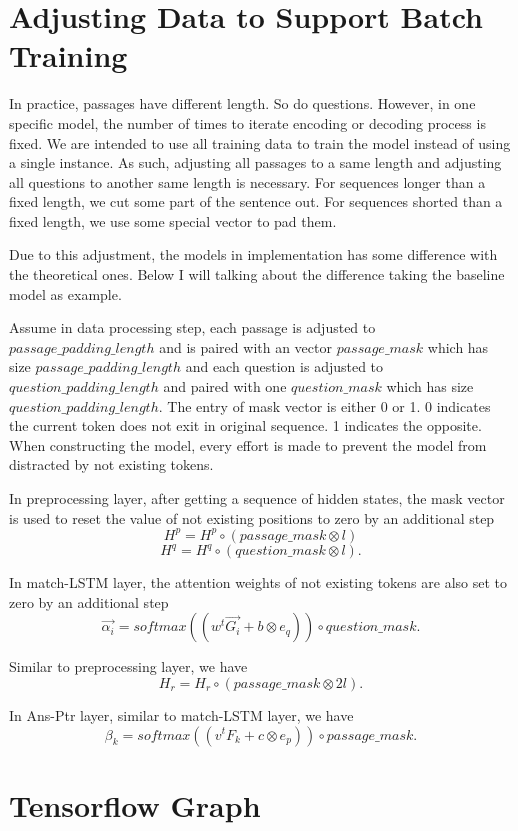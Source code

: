 \documentclass[modernstyle,12pt]{sjsuthesis}
\theoremstyle{definition}
\begin{document}
\section{Adjusting Data to Support Batch Training}\label{sect:padding}

In practice, passages have different length. So do questions. However, in one specific model, the number of times to iterate encoding or decoding process is fixed. We are intended to use all training data to train the model instead of using a single instance. As such, adjusting all passages to a same length and adjusting all questions to another same length is necessary. For sequences longer than a fixed length, we cut some part of the sentence out. For sequences shorted than a fixed length, we use some special vector to pad them.

Due to this adjustment, the models in implementation has some difference with the theoretical ones. Below I will talking about the difference taking the baseline model as example.

Assume in data processing step, each passage is adjusted to $passage\_padding\_length$ and is paired with an vector $passage\_mask$ which has size $passage\_padding\_length$ and each question is adjusted to $question\_padding\_length$ and paired with one $question\_mask$ which has size $question\_padding\_length$. The entry of mask vector is either 0 or 1. 0 indicates the current token does not exit in original sequence. 1 indicates the opposite. When constructing the model, every effort is made to prevent the model from distracted by not existing tokens.

In preprocessing layer, after getting a sequence of hidden states, the mask vector is used to reset the value of not existing positions to zero by an additional step
$$H^p = H^p \circ (passage\_mask \otimes l)$$
$$H^q = H^q \circ (question\_mask \otimes l).$$

In match-LSTM layer, the attention weights of not existing tokens are also set to zero by an additional step
$$\overrightarrow{\alpha _i} = softmax( (w^t\overrightarrow{G_i} + b \otimes e_q) ) \circ question\_mask .$$

Similar to preprocessing layer, we have
$$H_r = H_r \circ (passage\_mask \otimes 2l).$$

In Ans-Ptr layer, similar to match-LSTM layer, we have
$$\beta _k = softmax( (v^tF_k + c \otimes e_p) ) \circ passage\_mask.$$


\section{Tensorflow Graph}
\end{document}
